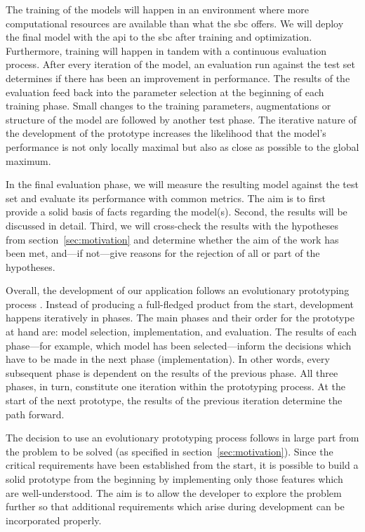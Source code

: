 \documentclass[draft,final]{vutinfth} %
\begin{document}
The training of the models will happen in an environment where more
computational resources are available than what the \gls{sbc}
offers. We will deploy the final model with the \gls{api} to the
\gls{sbc} after training and optimization. Furthermore, training will
happen in tandem with a continuous evaluation process. After every
iteration of the model, an evaluation run against the test set
determines if there has been an improvement in performance. The
results of the evaluation feed back into the parameter selection at
the beginning of each training phase. Small changes to the training
parameters, augmentations or structure of the model are followed by
another test phase. The iterative nature of the development of the
prototype increases the likelihood that the model's performance is not
only locally maximal but also as close as possible to the global
maximum.

In the final evaluation phase, we will measure the resulting model
against the test set and evaluate its performance with common
metrics. The aim is to first provide a solid basis of facts regarding
the model(s). Second, the results will be discussed in detail. Third,
we will cross-check the results with the hypotheses from
section~\ref{sec:motivation} and determine whether the aim of the work
has been met, and—if not—give reasons for the rejection of all or part
of the hypotheses.

Overall, the development of our application follows an evolutionary
prototyping process \cite{davis1992,sears2007}. Instead of producing a
full-fledged product from the start, development happens iteratively
in phases. The main phases and their order for the prototype at hand
are: model selection, implementation, and evaluation. The results of
each phase—for example, which model has been selected—inform the
decisions which have to be made in the next phase (implementation). In
other words, every subsequent phase is dependent on the results of the
previous phase. All three phases, in turn, constitute one iteration
within the prototyping process. At the start of the next prototype,
the results of the previous iteration determine the path forward.

The decision to use an evolutionary prototyping process follows in
large part from the problem to be solved (as specified in
section~\ref{sec:motivation}). Since the critical requirements have
been established from the start, it is possible to build a solid
prototype from the beginning by implementing only those features which
are well-understood. The aim is to allow the developer to explore the
problem further so that additional requirements which arise during
development can be incorporated properly.
\end{document}
